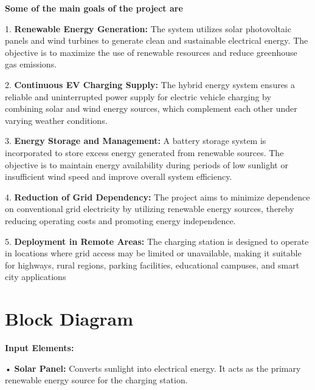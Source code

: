 \documentclass[12pt]{report}
\begin{document}
\begin{Certificatepage}
\begin{center}
\begin{justify}
\vspace{10pt} %

\textbf{Some of the main goals of the project are}

\vspace{10pt} %
1. \textbf{Renewable Energy Generation:} The system utilizes solar photovoltaic panels and wind turbines to generate clean and sustainable electrical energy. The objective is to maximize the use of renewable resources and reduce greenhouse gas emissions.

\vspace{10pt} %
2. \textbf{Continuous EV Charging Supply:} The hybrid energy system ensures a reliable and uninterrupted power supply for electric vehicle charging by combining solar and wind energy sources, which complement each other under varying weather conditions.

\vspace{10pt} %
3. \textbf{Energy Storage and Management:} A battery storage system is incorporated to store excess energy generated from renewable sources. The objective is to maintain energy availability during periods of low sunlight or insufficient wind speed and improve overall system efficiency.

\vspace{10pt} %
4. \textbf{Reduction of Grid Dependency:} The project aims to minimize dependence on conventional grid electricity by utilizing renewable energy sources, thereby reducing operating costs and promoting energy independence.

\vspace{10pt} %
5. \textbf{Deployment in Remote Areas:} The charging station is designed to operate in locations where grid access may be limited or unavailable, making it suitable for highways, rural regions, parking facilities, educational campuses, and smart city applications

\newpage

\section{Block Diagram} %
\setlength{\parindent}{0pt} %
\textbf{Input Elements:}

\vspace{10pt}
• \textbf{Solar Panel:} Converts sunlight into electrical energy. It acts as the primary renewable energy source for the charging station.


\end{justify}
\end{center}
\end{Certificatepage}
\end{document}
